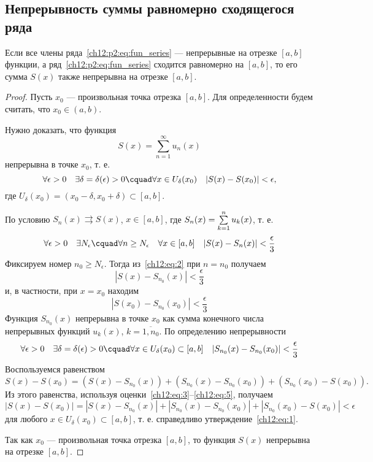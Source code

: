 \subsection{Непрерывность суммы равномерно сходящегося ряда}

\begin{thm}
	\label{ch12:th:continuity}
	Если все члены ряда~\eqref{ch12:p2:eq:fun_series} --- непрерывные на отрезке $[a, b]$ функции,
	а ряд~\eqref{ch12:p2:eq:fun_series} сходится равномерно на $[a, b]$, то его сумма $S(x)$
	также непрерывна на отрезке $[a, b]$.
\end{thm}
\begin{proof}
	Пусть $x_0$ --- произвольная точка отрезка $[a, b]$. Для определенности будем считать,
	что $x_0 \in (a, b)$.

	Нужно доказать, что функция
	$$
		S(x) = \sum_{n=1}^{\infty} u_n(x)
	$$
	непрерывна в точке $x_0$, т. е.
	\begin{equation}
		\label{ch12:eq:1}
		\forall \epsilon > 0 \quad \exists \delta = \delta(\epsilon) > 0 \cquad
			\forall x \in U_{\delta}(x_0) \quad |S(x) - S(x_0)| < \epsilon,
	\end{equation}
	где $U_{\delta}(x_0) = (x_0 - \delta, x_0 + \delta) \subset [a, b]$.

	По условию $S_n(x) \rightrightarrows S(x)$, $x \in [a, b]$,
	где $S_n(x) = \sum_{k=1}^{n}\limits u_k(x)$, т. е.
	\begin{equation}
		\label{ch12:eq:2}
		\forall \epsilon > 0 \quad \exists N_{\epsilon} \cquad \forall n \ge N_{\epsilon} \quad
			\forall x \in [a, b] \quad |S(x) - S_n(x)| < \frac{\epsilon}{3}
	\end{equation}
	Фиксируем номер $n_0 \ge N_{\epsilon}$. Тогда из~\eqref{ch12:eq:2} при $n = n_0$ получаем
	\begin{equation}
		\label{ch12:eq:3}
		|S(x) - S_{n_0}(x)| < \frac{\epsilon}{3}
	\end{equation}
	и, в частности, при $x = x_0$ находим
	\begin{equation}
		\label{ch12:eq:4}
		|S(x_0) - S_{n_0}(x_0)| < \frac{\epsilon}{3}
	\end{equation}
	Функция $S_{n_0}(x)$ непрерывна в точке $x_0$ как сумма конечного числа непрерывных функций
	$u_k(x)$, $k = \overline{1, n_0}$. По определению непрерывности
	\begin{equation}
		\label{ch12:eq:5}
		\forall \epsilon > 0 \quad \exists \delta = \delta(\epsilon) > 0 \cquad
			\forall x \in U_\delta(x_0) \subset [a, b] \quad |S_{n_0}(x) - S_{n_0}(x_0)| < \frac{\epsilon}{3}
	\end{equation}
	Воспользуемся равенством
	$$
		S(x) - S(x_0) = (S(x) - S_{n_0}(x)) + (S_{n_0}(x) - S_{n_0}(x_0)) + (S_{n_0}(x_0) - S(x_0)).
	$$
	Из этого равенства, используя оценки~\eqref{ch12:eq:3}--\eqref{ch12:eq:5}, получаем
	$$
		|S(x) - S(x_0)| = |S(x) - S_{n_0}(x)| + |S_{n_0}(x) - S_{n_0}(x_0)| + |S_{n_0}(x_0) - S(x_0)| < \epsilon
	$$
	для любого $x \in U_\delta(x_0) \subset [a, b]$, т. е. справедливо утверждение~\eqref{ch12:eq:1}.

	Так как $x_0$ --- произвольная точка отрезка $[a, b]$, то функция $S(x)$ непрерывна на отрезке $[a, b]$.
\end{proof}

